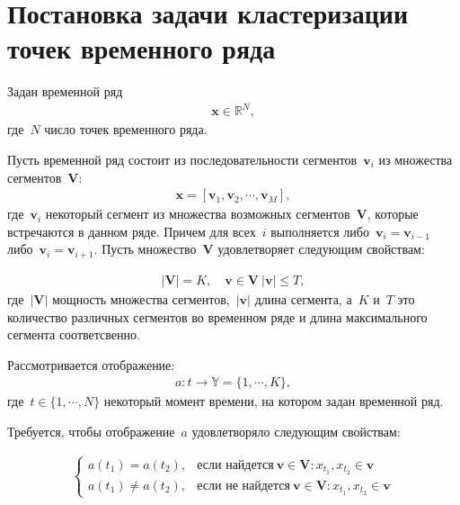 \documentclass[12pt, twoside]{article}
\numberwithin{equation}{section}
\begin{document}
\section{Постановка задачи кластеризации точек временного ряда}

Задан временной ряд
\begin{equation}
\label{eq:st:1}
\begin{aligned}
\textbf{x} \in \mathbb{R}^{N},
\end{aligned}
\end{equation}
где~$N$ число точек временного ряда.

Пусть временной ряд состоит из последовательности сегментов~$\textbf{v}_i$ из множества сегментов~$\mathbf{V}$:
\begin{equation}
\label{eq:st:2}
\begin{aligned}
\textbf{x} = [\textbf{v}_1, \textbf{v}_2, \cdots, \textbf{v}_M],
\end{aligned}
\end{equation}
где~$\textbf{v}_i$ некоторый сегмент из множества возможных сегментов~$\mathbf{V}$, которые встречаются в данном ряде. Причем для всех~$i$ выполняется либо~$\textbf{v}_i = \textbf{v}_{i-1}$ либо~$\textbf{v}_i = \textbf{v}_{i+1}$. Пусть множество~$\mathbf{V}$ удовлетворяет следующим свойствам:

\begin{equation}
\label{eq:st:3}
\begin{aligned}
\left|\mathbf{V}\right| = K, \quad \textbf{v} \in \mathbf{V}~\left|\textbf{v}\right| \leq T,
\end{aligned}
\end{equation}
где~$\left|\mathbf{V}\right|$ мощность множества сегментов,~$\left|\textbf{v}\right|$ длина сегмента, а~$K$ и~$T$ это количество различных сегментов во временном ряде и длина максимального сегмента соответсвенно.

Рассмотривается отображение:
\begin{equation}
\label{eq:st:4}
\begin{aligned}
a : t \to \mathbb{Y} = \{1,\cdots, K\}, 
\end{aligned}
\end{equation}
где~$t \in \{1,\cdots, N\}$ некоторый момент времени, на котором задан временной ряд.

Требуется, чтобы отображение~$a$ удовлетворяло следующим свойствам:

\begin{equation}
\label{eq:st:5}
\begin{aligned}
\begin{cases}
    a\left(t_1\right) = a\left(t_2\right), & \text{если найдется}~\textbf{v} \in \mathbf{V}: x_{t_1},x_{t_2} \in \textbf{v}\\
    a\left(t_1\right) \not= a\left(t_2\right), & \text{если не найдется}~\textbf{v} \in \mathbf{V}: x_{t_1},x_{t_2} \in \textbf{v}
\end{cases}
\end{aligned}
\end{equation}
\end{document}
